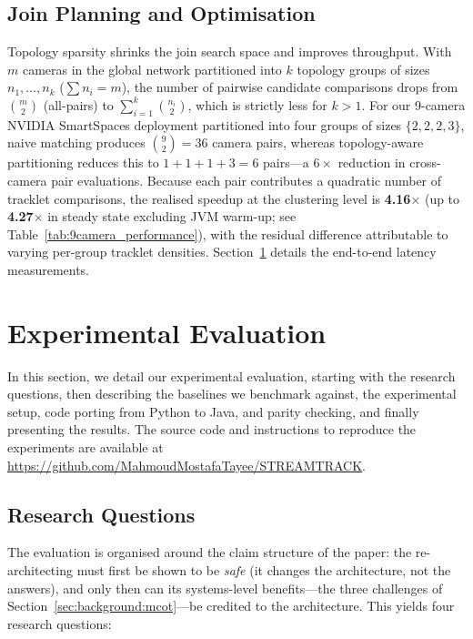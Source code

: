\documentclass[review]{elsarticle}
\begin{document}
\subsection{Join Planning and Optimisation}
\label{sec:multi:joinplan}
Topology sparsity shrinks the join search space and improves throughput. With $m$ cameras in the global network partitioned into $k$ topology groups of sizes $n_1, \dots, n_k$ ($\sum n_i = m$), the number of pairwise candidate comparisons drops from $\binom{m}{2}$ (all-pairs) to $\sum_{i=1}^{k} \binom{n_i}{2}$, which is strictly less for $k > 1$. For our 9-camera NVIDIA SmartSpaces deployment partitioned into four groups of sizes $\{2, 2, 2, 3\}$, naive matching produces $\binom{9}{2} = 36$ camera pairs, whereas topology-aware partitioning reduces this to $1 + 1 + 1 + 3 = 6$ pairs---a $6\times$ reduction in cross-camera pair evaluations. Because each pair contributes a quadratic number of tracklet comparisons, the realised speedup at the clustering level is \textbf{4.16$\times$} (up to \textbf{4.27$\times$} in steady state excluding JVM warm-up; see Table~\ref{tab:9camera_performance}), with the residual difference attributable to varying per-group tracklet densities. Section~\ref{sec:evaluation} details the end-to-end latency measurements.


\section{Experimental Evaluation}\label{sec:evaluation}

In this section, we detail our experimental evaluation, starting with the research questions, then describing the baselines we benchmark against, the experimental setup, code porting from Python to Java, and parity checking, and finally presenting the results. The source code and instructions to reproduce the experiments are available at \url{https://github.com/MahmoudMostafaTayee/STREAMTRACK}.

\subsection{Research Questions}
The evaluation is organised around the claim structure of the paper: the re-architecting must
first be shown to be \emph{safe} (it changes the architecture, not the answers), and only then
can its systems-level benefits---the three challenges of
Section~\ref{sec:background:mcot}---be credited to the architecture. This yields four research
questions:
 
\end{document}
